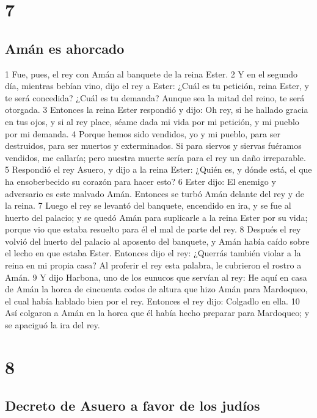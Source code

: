 \chapter{7}

\section*{Amán es ahorcado}


1 Fue, pues, el rey con Amán al banquete de la reina Ester.
2 Y en el segundo día, mientras bebían vino, dijo el rey a Ester: ¿Cuál es tu petición, reina Ester, y te será concedida? ¿Cuál es tu demanda? Aunque sea la mitad del reino, te será otorgada.
3 Entonces la reina Ester respondió y dijo: Oh rey, si he hallado gracia en tus ojos, y si al rey place, séame dada mi vida por mi petición, y mi pueblo por mi demanda.
4 Porque hemos sido vendidos, yo y mi pueblo, para ser destruidos, para ser muertos y exterminados. Si para siervos y siervas fuéramos vendidos, me callaría; pero nuestra muerte sería para el rey un daño irreparable.
5 Respondió el rey Asuero, y dijo a la reina Ester: ¿Quién es, y dónde está, el que ha ensoberbecido su corazón para hacer esto?
6 Ester dijo: El enemigo y adversario es este malvado Amán. Entonces se turbó Amán delante del rey y de la reina.
7 Luego el rey se levantó del banquete, encendido en ira, y se fue al huerto del palacio; y se quedó Amán para suplicarle a la reina Ester por su vida; porque vio que estaba resuelto para él el mal de parte del rey.
8 Después el rey volvió del huerto del palacio al aposento del banquete, y Amán había caído sobre el lecho en que estaba Ester. Entonces dijo el rey: ¿Querrás también violar a la reina en mi propia casa? Al proferir el rey esta palabra, le cubrieron el rostro a Amán.
9 Y dijo Harbona, uno de los eunucos que servían al rey: He aquí en casa de Amán la horca de cincuenta codos   de altura que hizo Amán para Mardoqueo, el cual había hablado bien por el rey. Entonces el rey dijo: Colgadlo en ella.
10 Así colgaron a Amán en la horca que él había hecho preparar para Mardoqueo; y se apaciguó la ira del rey.

\chapter{8}

\section*{Decreto de Asuero a favor de los judíos }


